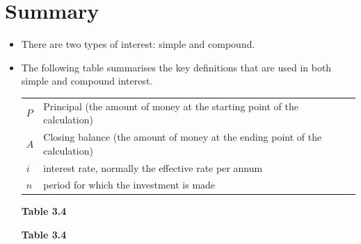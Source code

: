             \section{ Summary}
            \nopagebreak
            \label{m39335*eip-923}\begin{itemize}[noitemsep]
            \item There are two types of interest: simple and compound.\item The following table summarises the key definitions that are used in both simple and compound interest.
          \begin{table}[H]
        \begin{center}
      \label{m39335*id75382}
    \noindent
      \tablelasttail{}
      \begin{xtabular}[t]{|l|l|}\hline
                  $P$
                 &
        Principal (the amount of money at the starting point of the calculation)%
     \tabularnewline{}
                  $A$
                 &
        Closing balance (the amount of money at the ending point of the calculation)%
     \tabularnewline{}
                  $i$
                 &
        interest rate, normally the effective rate per annum%
     \tabularnewline{}
                  $n$
                 &
        period for which the investment is made%
     \tabularnewline{}
    \end{xtabular}
      \end{center}
    \begin{center}{\small\bfseries Table 3.4}\end{center}
    \begin{caption}{\small\bfseries Table 3.4}\end{caption}

\end{table}
\end{itemize}
